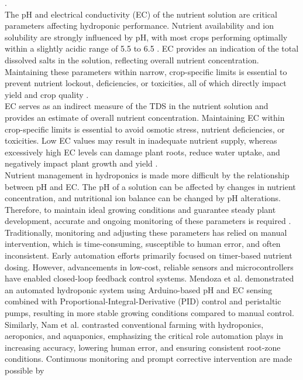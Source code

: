 \cite{savvas2018}.\\[10pt]
The pH and electrical conductivity (EC) of the nutrient solution are critical parameters
affecting hydroponic performance. Nutrient availability and ion solubility are strongly
influenced by pH, with most crops performing optimally within a slightly acidic range
of 5.5 to 6.5 \cite{trejo2012}. EC provides an indication of the total dissolved salts in the
solution, reflecting overall nutrient concentration. Maintaining these parameters within
narrow, crop-specific limits is essential to prevent nutrient lockout, deficiencies, or toxicities,
all of which directly impact yield and crop quality \cite{hansen1978}.\\[10pt]
EC serves as an indirect measure of the TDS in the nutrient solution and provides an
estimate of overall nutrient concentration. Maintaining EC within crop-specific limits is
essential to avoid osmotic stress, nutrient deficiencies, or toxicities. Low EC values may
result in inadequate nutrient supply, whereas excessively high EC levels can damage
plant roots, reduce water uptake, and negatively impact plant growth and yield \cite{hansen1978}.\\[10pt]
Nutrient management in hydroponics is made more difficult by the relationship
between pH and EC. The pH of a solution can be affected by changes in nutrient concentration,
and nutritional ion balance can be changed by pH alterations. Therefore, to maintain ideal
growing conditions and guarantee steady plant development, accurate and ongoing
monitoring of these parameters is required \cite{hansen1978}.\\[10pt]
Traditionally, monitoring and adjusting these parameters has relied on manual intervention,
which is time-consuming, susceptible to human error, and often inconsistent. Early
automation efforts primarily focused on timer-based nutrient dosing. However, advancements
in low-cost, reliable sensors and microcontrollers have enabled closed-loop feedback
control systems. Mendoza et al. \cite{mendoza2020} demonstrated an automated hydroponic
system using Arduino-based pH and EC sensing combined with Proportional-Integral-Derivative
(PID) control and peristaltic pumps, resulting in more stable growing conditions compared
to manual control. Similarly, Nam et al. \cite{nam1996} contrasted conventional farming
with hydroponics, aeroponics, and aquaponics, emphasizing the critical role automation plays
in increasing accuracy, lowering human error, and ensuring consistent root-zone
conditions. Continuous monitoring and prompt corrective intervention are made possible by
